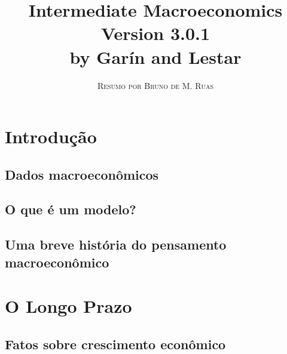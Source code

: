 \documentclass[a4paper,11pt]{book}
\title{\Huge \textbf{Intermediate Macroeconomics} \\ 
\Large Version 3.0.1 \\
\huge by Garín and Lestar}
\author{\textsc{Resumo por Bruno de M. Ruas}}
\theoremstyle{definition}
\begin{document}
\frontmatter
\maketitle

\tableofcontents

\mainmatter

\part{Introdução}

\chapter{Dados macroeconômicos}

\chapter{O que é um modelo?}

\chapter{Uma breve história do pensamento macroeconômico}

\part{O Longo Prazo}

\chapter{Fatos sobre crescimento econômico}
\end{document}
